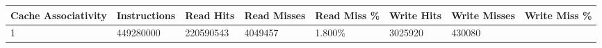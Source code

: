 \documentclass[11pt]{article}
\begin{document}
\begin{longtable}[]{@{}llllllll@{}}
\toprule
\begin{minipage}[b]{0.14\columnwidth}\raggedright\strut
Cache Associativity\strut
\end{minipage} & \begin{minipage}[b]{0.10\columnwidth}\raggedright\strut
Instructions\strut
\end{minipage} & \begin{minipage}[b]{0.08\columnwidth}\raggedright\strut
Read Hits\strut
\end{minipage} & \begin{minipage}[b]{0.09\columnwidth}\raggedright\strut
Read Misses\strut
\end{minipage} & \begin{minipage}[b]{0.09\columnwidth}\raggedright\strut
Read Miss \%\strut
\end{minipage} & \begin{minipage}[b]{0.08\columnwidth}\raggedright\strut
Write Hits\strut
\end{minipage} & \begin{minipage}[b]{0.10\columnwidth}\raggedright\strut
Write Misses\strut
\end{minipage} & \begin{minipage}[b]{0.10\columnwidth}\raggedright\strut
Write Miss \%\strut
\end{minipage}\tabularnewline
\midrule
\endhead
\begin{minipage}[t]{0.14\columnwidth}\raggedright\strut
1\strut
\end{minipage} & \begin{minipage}[t]{0.10\columnwidth}\raggedright\strut
449280000\strut
\end{minipage} & \begin{minipage}[t]{0.08\columnwidth}\raggedright\strut
220590543\strut
\end{minipage} & \begin{minipage}[t]{0.09\columnwidth}\raggedright\strut
4049457\strut
\end{minipage} & \begin{minipage}[t]{0.09\columnwidth}\raggedright\strut
1.800\%\strut
\end{minipage} & \begin{minipage}[t]{0.08\columnwidth}\raggedright\strut
3025920\strut
\end{minipage} & \begin{minipage}[t]{0.10\columnwidth}\raggedright\strut
430080\strut

\end{minipage}
\end{longtable}
\end{document}
